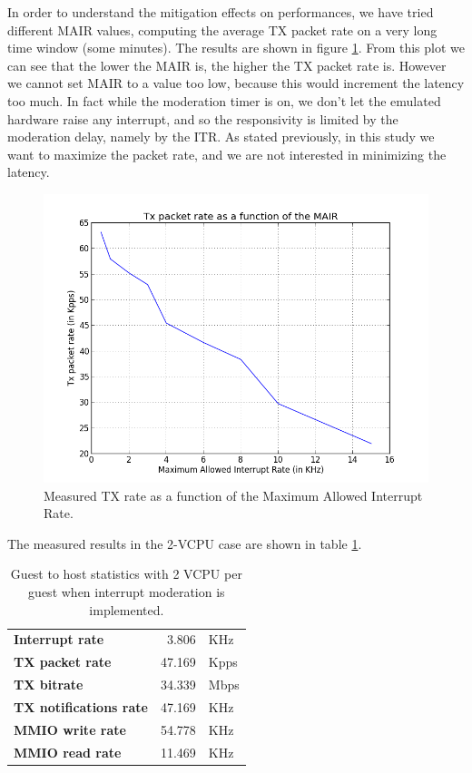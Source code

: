 \vspace{0.5cm}

In order to understand the mitigation effects on performances, we have tried different MAIR values, computing the average TX packet 
rate on a very long time window (some minutes). The results are shown in figure \ref{fig:itr-vs-txrate}.
From this plot we can see that the lower the MAIR is, the higher the TX packet rate is. However we cannot set MAIR to a value too low,
because this would increment the latency too much. In fact while the moderation timer is on, we don't let the emulated hardware raise
any interrupt, and so the responsivity is limited by the moderation delay, namely by the ITR.
As stated previously, in this study we want to maximize the packet rate, and we are not interested in minimizing the latency.

\begin{figure}[bt]
\centering
\includegraphics[scale = 0.7]{MAIR-vs-TXRate.png}
\caption{Measured TX rate as a function of the Maximum Allowed Interrupt Rate.}
\label{fig:itr-vs-txrate}
\end{figure}

\vspace{0.5cm}

The measured results in the 2-VCPU case are shown in table \ref{tab:e1000-mit-tx-g2h2vcpu}.

\begin{table}
\begin{center}
\begin{tabular}{lrl}
\toprule
\textbf{Interrupt rate} & 3.806 & KHz\\
\textbf{TX packet rate} & 47.169 & Kpps\\
\textbf{TX bitrate} & 34.339 & Mbps\\
\textbf{TX notifications rate} & 47.169 & KHz\\
\textbf{MMIO write rate} & 54.778 & KHz\\
\textbf{MMIO read rate} & 11.469 & KHz\\
\bottomrule
\end{tabular}
\end{center}
\caption{Guest to host statistics with 2 VCPU per guest when interrupt moderation is implemented.}
\label{tab:e1000-mit-tx-g2h2vcpu}
\end{table}

